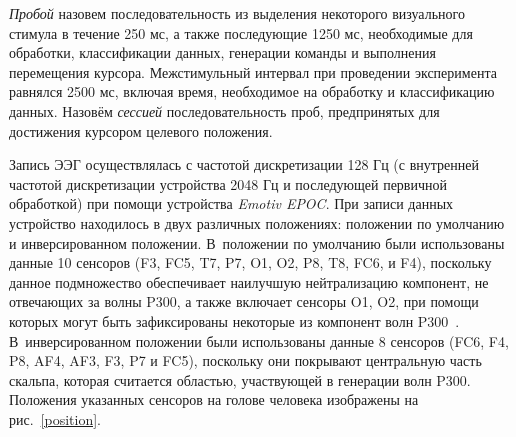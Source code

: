 \documentclass[12pt,a4paper,oneside,fleqn,leqno]{article}
\begin{document}
	\par {\it Пробой} назовем последовательность из выделения некоторого визуального стимула в течение 250 мс, а также последующие 1250 мс, необходимые для обработки, классификации данных, генерации команды и выполнения перемещения курсора. Межстимульный интервал при проведении эксперимента равнялся 2500 мс, включая время, необходимое на обработку и классификацию данных. Назовём {\it сессией} последовательность проб, предпринятых для достижения курсором целевого положения.
	\par Запись ЭЭГ осуществлялась с частотой дискретизации 128 Гц (с внутренней частотой дискретизации устройства 2048 Гц и последующей первичной обработкой) при помощи устройства {\it Emotiv EPOC}. При записи данных устройство находилось в двух различных положениях: положении по умолчанию и инверсированном положении. В~положении по умолчанию были использованы данные 10 сенсоров (F3, FC5, T7, P7, O1, O2, P8, T8, FC6, и F4), поскольку данное подмножество обеспечивает наилучшую нейтрализацию компонент, не отвечающих за волны P300, а также включает сенсоры O1, O2, при помощи которых могут быть зафиксированы некоторые из компонент волн P300~\cite{ensemble}. В~инверсированном положении были использованы данные 8 сенсоров (FC6, F4, P8, AF4, AF3, F3, P7 и FC5), поскольку они покрывают центральную часть скальпа, которая считается областью, участвующей в генерации волн P300. Положения указанных сенсоров на голове человека изображены на рис.~\ref{position}.
\end{document}
